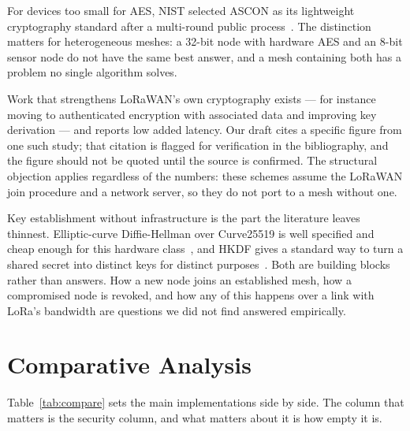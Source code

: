\documentclass[conference]{IEEEtran}
\begin{document}
For devices too small for AES, NIST selected ASCON as its lightweight
cryptography standard after a multi-round public
process~\cite{nist2023ascon}. The distinction matters for heterogeneous meshes: a
32-bit node with hardware AES and an 8-bit sensor node do not have the same best
answer, and a mesh containing both has a problem no single algorithm solves.

Work that strengthens LoRaWAN's own cryptography exists — for instance moving to
authenticated encryption with associated data and improving key derivation — and
reports low added latency. Our draft cites a specific figure from one such study;
that citation is flagged for verification in the bibliography, and the figure
should not be quoted until the source is confirmed. The structural objection
applies regardless of the numbers: these schemes assume the LoRaWAN join
procedure and a network server, so they do not port to a mesh without one.

Key establishment without infrastructure is the part the literature leaves
thinnest. Elliptic-curve Diffie-Hellman over Curve25519 is well specified and
cheap enough for this hardware class~\cite{rfc7748}, and HKDF gives a standard way
to turn a shared secret into distinct keys for distinct purposes~\cite{rfc5869}.
Both are building blocks rather than answers. How a new node joins an established
mesh, how a compromised node is revoked, and how any of this happens over a link
with LoRa's bandwidth are questions we did not find answered empirically.

\section{Comparative Analysis}\label{sec:compare}

Table~\ref{tab:compare} sets the main implementations side by side. The column
that matters is the security column, and what matters about it is how empty it is.
\end{document}
